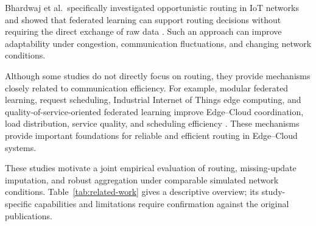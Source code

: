 \documentclass[5p,times,numafflabel]{elsarticle}
\begin{document}
	Bhardwaj et al.\ specifically investigated opportunistic routing in
	IoT networks and showed that federated learning can support routing
	decisions without requiring the direct exchange of raw data
	\cite{bhardwaj2024routing}. Such an approach can improve adaptability
	under congestion, communication fluctuations, and changing network
	conditions.
	
	Although some studies do not directly focus on routing, they provide
	mechanisms closely related to communication efficiency. For example,
	modular federated learning, request scheduling, Industrial Internet of
	Things edge computing, and quality-of-service-oriented federated
	learning improve Edge--Cloud coordination, load distribution, service
	quality, and scheduling efficiency
	\cite{almeida2025modular,aburukba2025scheduling,liu2024iiot,zhou2024qos}.
	These mechanisms provide important foundations for reliable and
	efficient routing in Edge--Cloud systems.
	
	These studies motivate a joint empirical evaluation of routing,
	missing-update imputation, and robust aggregation under comparable
	simulated network conditions. Table~\ref{tab:related-work} gives a
	descriptive overview; its study-specific capabilities and limitations
	require confirmation against the original publications.
	
\end{document}
